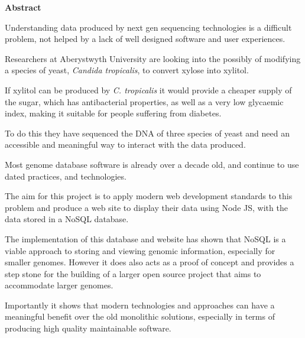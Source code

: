 \thispagestyle{empty}

\begin{center}
    {\LARGE\bf Abstract}
\end{center}

Understanding data produced by next gen sequencing technologies is a difficult problem, not helped by a lack of well designed software and user experiences. 

Researchers at Aberystwyth University are looking into the possibly of modifying a species of yeast, \textit{Candida tropicalis}, to convert xylose into xylitol. 

If xylitol can be produced by \textit{C. tropicalis} it would provide a cheaper supply of the sugar, which has antibacterial properties, as well as a very low glycaemic index, making it suitable for people suffering from diabetes.

To do this they have sequenced the DNA of three species of yeast and need an accessible and meaningful way to interact with the data produced.

Most genome database software is already over a decade old, and continue to use dated practices, and technologies. 

The aim for this project is to apply modern web development standards to this problem and produce a web site to display their data using Node JS, with the data stored in a NoSQL database. 

The implementation of this database and website has shown that NoSQL is a viable approach to storing and viewing genomic information, especially for smaller genomes. However it does also acts as a proof of concept and provides a step stone for the building of a larger open source project that aims to accommodate larger genomes. 

Importantly it shows that modern technologies and approaches can have a meaningful benefit over the old monolithic solutions, especially in terms of producing high quality maintainable software.
